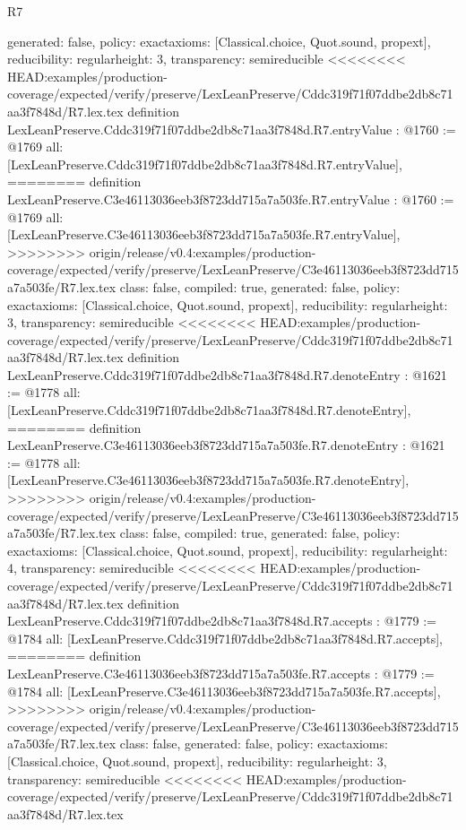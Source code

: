 \begin{lexlean}{R7}
\begin{coremodule}
{{{{{{{{{{{{{{{  generated: false,
  policy: exact{axioms: [Classical.choice, Quot.sound, propext]},
  reducibility: regular{height: 3},
  transparency: semireducible
}
<<<<<<<< HEAD:examples/production-coverage/expected/verify/preserve/LexLeanPreserve/Cddc319f71f07ddbe2db8c71aa3f7848d/R7.lex.tex
definition LexLeanPreserve.Cddc319f71f07ddbe2db8c71aa3f7848d.R7.entryValue : @1760 := @1769 {
  all: [LexLeanPreserve.Cddc319f71f07ddbe2db8c71aa3f7848d.R7.entryValue],
========
definition LexLeanPreserve.C3e46113036eeb3f8723dd715a7a503fe.R7.entryValue : @1760 := @1769 {
  all: [LexLeanPreserve.C3e46113036eeb3f8723dd715a7a503fe.R7.entryValue],
>>>>>>>> origin/release/v0.4:examples/production-coverage/expected/verify/preserve/LexLeanPreserve/C3e46113036eeb3f8723dd715a7a503fe/R7.lex.tex
  class: false,
  compiled: true,
  generated: false,
  policy: exact{axioms: [Classical.choice, Quot.sound, propext]},
  reducibility: regular{height: 3},
  transparency: semireducible
}
<<<<<<<< HEAD:examples/production-coverage/expected/verify/preserve/LexLeanPreserve/Cddc319f71f07ddbe2db8c71aa3f7848d/R7.lex.tex
definition LexLeanPreserve.Cddc319f71f07ddbe2db8c71aa3f7848d.R7.denoteEntry : @1621 := @1778 {
  all: [LexLeanPreserve.Cddc319f71f07ddbe2db8c71aa3f7848d.R7.denoteEntry],
========
definition LexLeanPreserve.C3e46113036eeb3f8723dd715a7a503fe.R7.denoteEntry : @1621 := @1778 {
  all: [LexLeanPreserve.C3e46113036eeb3f8723dd715a7a503fe.R7.denoteEntry],
>>>>>>>> origin/release/v0.4:examples/production-coverage/expected/verify/preserve/LexLeanPreserve/C3e46113036eeb3f8723dd715a7a503fe/R7.lex.tex
  class: false,
  compiled: true,
  generated: false,
  policy: exact{axioms: [Classical.choice, Quot.sound, propext]},
  reducibility: regular{height: 4},
  transparency: semireducible
}
<<<<<<<< HEAD:examples/production-coverage/expected/verify/preserve/LexLeanPreserve/Cddc319f71f07ddbe2db8c71aa3f7848d/R7.lex.tex
definition LexLeanPreserve.Cddc319f71f07ddbe2db8c71aa3f7848d.R7.accepts : @1779 := @1784 {
  all: [LexLeanPreserve.Cddc319f71f07ddbe2db8c71aa3f7848d.R7.accepts],
========
definition LexLeanPreserve.C3e46113036eeb3f8723dd715a7a503fe.R7.accepts : @1779 := @1784 {
  all: [LexLeanPreserve.C3e46113036eeb3f8723dd715a7a503fe.R7.accepts],
>>>>>>>> origin/release/v0.4:examples/production-coverage/expected/verify/preserve/LexLeanPreserve/C3e46113036eeb3f8723dd715a7a503fe/R7.lex.tex
  class: false,
  generated: false,
  policy: exact{axioms: [Classical.choice, Quot.sound, propext]},
  reducibility: regular{height: 3},
  transparency: semireducible
}
<<<<<<<< HEAD:examples/production-coverage/expected/verify/preserve/LexLeanPreserve/Cddc319f71f07ddbe2db8c71aa3f7848d/R7.lex.tex
}}}}}}}}}}}}}}}}}
\end{coremodule}
\end{lexlean}
